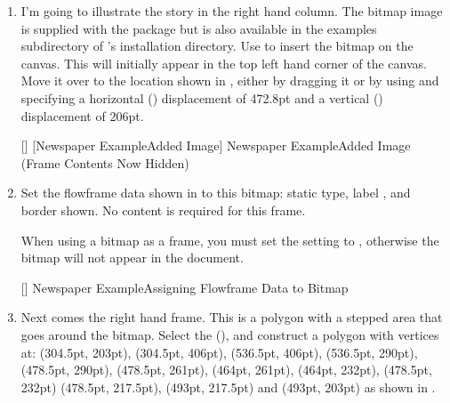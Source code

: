 \begin{enumerate}
[]
{}
{Newspaper Example\dash Assigning Flowframe Data to L Shaped
Frame}

The  setting uses the frame
rectangular inner area as a guide to location and dimensions. It
doesn't take the shape into account. This means that the frame
contents has lines stretching across to the right. This can result
in a cluttered \gls{canvas}, so you may prefer to switch off the
feature at this point. You can do this from the 
tab of the  dialog, which can be opened with 
the  menu item. Uncheck the
 checkbox and click on the
 button.

\item I'm going to illustrate the story in the right hand column.
The \gls{bitmap} image  is supplied with the 
package but is also available in the examples subdirectory of
\FlowframTk's installation directory. Use 
to insert the \gls{bitmap} on the \gls{canvas}. This will initially
appear in the top left hand corner of the \gls{canvas}. Move it
over to the location shown in , either by
dragging it or by using  and specifying
a horizontal () displacement of 472.8pt
and a vertical () displacement of 206pt.

[]
{}
[Newspaper Example\dash Added Image]
{Newspaper Example\dash Added Image (Frame Contents Now Hidden)}

\item Set the \gls{flowframe} data shown in  to
this \gls{bitmap}: static type, label , and border
shown. No content is required for this frame.

\begin{information}
When using a \gls{bitmap} as a frame, you must set the
 setting to
, otherwise the \gls{bitmap}
will not appear in the document.
\end{information}

[]
{}
{Newspaper Example\dash Assigning Flowframe Data to Bitmap}

\item Next comes the right hand frame. This is a polygon with a
stepped area that goes around the bitmap. Select the
 (), and construct a
polygon with vertices at:
(304.5pt, 203pt), (304.5pt, 406pt), (536.5pt, 406pt),
(536.5pt, 290pt), (478.5pt, 290pt), (478.5pt, 261pt),
(464pt, 261pt), (464pt, 232pt), (478.5pt, 232pt)
(478.5pt, 217.5pt), (493pt, 217.5pt) and (493pt, 203pt) as shown in
.


\end{enumerate}
